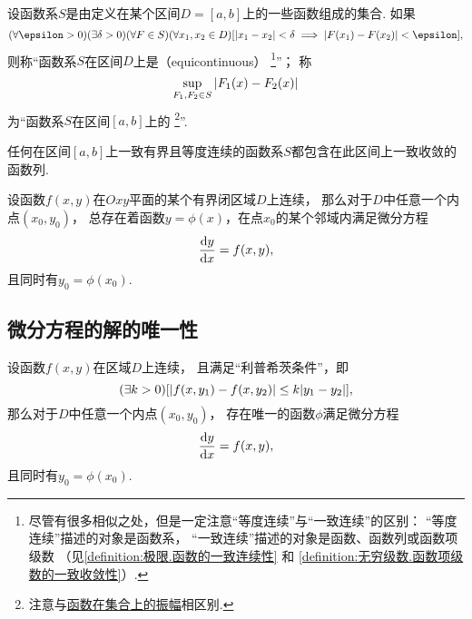 \begin{definition}\label{definition:微分方程.函数系的等度连续性}
设函数系\(S\)是由定义在某个区间\(D = [a,b]\)上的一些函数组成的集合.
如果\[
	(\forall\epsilon>0)
	(\exists\delta>0)
	(\forall F \in S)
	(\forall x_1,x_2 \in D)
	[\abs{x_1-x_2} < \delta \implies \abs{F(x_1)-F(x_2)} < \epsilon],
\]
则称“函数系\(S\)在区间\(D\)上是（equicontinuous）%
\footnote{尽管有很多相似之处，但是一定注意“等度连续”与“一致连续”的区别：
“等度连续”描述的对象是函数系，
“一致连续”描述的对象是函数、函数列或函数项级数
（见\cref{definition:极限.函数的一致连续性} 和
\cref{definition:无穷级数.函数项级数的一致收敛性}）.}”；
称\[
	\sup_{F_1,F_2 \in S} \abs{F_1(x)-F_2(x)}
\]为“函数系\(S\)在区间\([a,b]\)上的%
\footnote{注意与\hyperref[definition:极限.函数在集合上的振幅]{函数在集合上的振幅}相区别.}”.
\end{definition}

\begin{lemma}\label{theorem:微分方程概论.阿斯科拉--阿尔泽拉引理}
任何在区间\([a,b]\)上一致有界且等度连续的函数系\(S\)都包含在此区间上一致收敛的函数列.
\end{lemma}

\begin{theorem}
设函数\(f(x,y)\)在\(Oxy\)平面的某个有界闭区域\(D\)上连续，
那么对于\(D\)中任意一个内点\((x_0,y_0)\)，
总存在着函数\(y = \phi(x)\)，在点\(x_0\)的某个邻域内满足微分方程\[
\dv{y}{x} = f(x,y),
\]且同时有\(y_0 = \phi(x_0)\).
\end{theorem}

\subsection{微分方程的解的唯一性}
\begin{theorem}
设函数\(f(x,y)\)在区域\(D\)上连续，
且满足“利普希茨条件”，即\[
	(\exists k>0)
	[
		\abs{f(x,y_1) - f(x,y_2)}
		\leq
		k \abs{y_1 - y_2}
	],
\]
那么对于\(D\)中任意一个内点\((x_0,y_0)\)，
存在唯一的函数\(\phi\)满足微分方程\[
	\dv{y}{x} = f(x,y),
\]
且同时有\(y_0 = \phi(x_0)\).
\end{theorem}
